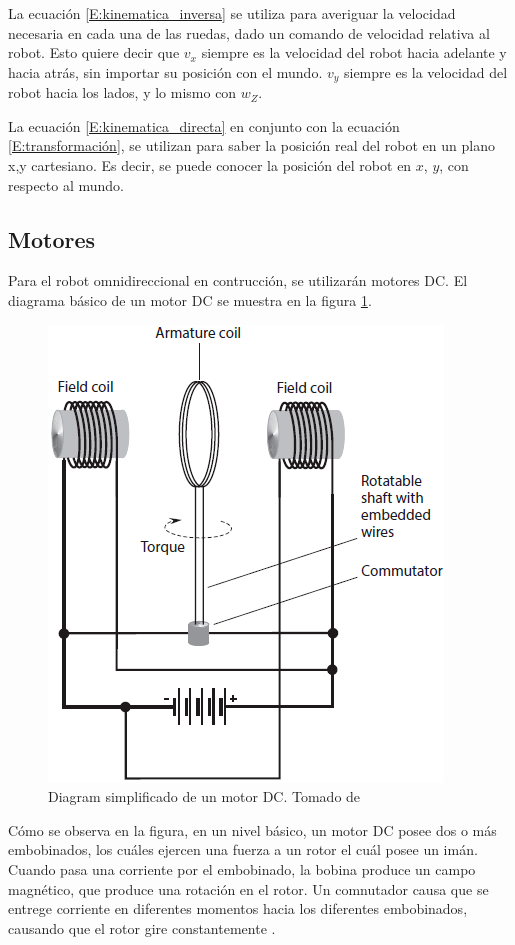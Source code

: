 La ecuación \ref{E:kinematica_inversa} se utiliza para averiguar la velocidad necesaria en cada una de las ruedas, dado un comando de velocidad relativa al robot. Esto quiere decir que $v_x$ siempre es la velocidad del robot hacia adelante y hacia atrás, sin importar su posición con el mundo. $v_y$ siempre es la velocidad del robot hacia los lados, y lo mismo con $w_Z$.

La ecuación \ref{E:kinematica_directa} en conjunto con la ecuación \ref{E:transformación}, se utilizan para saber la posición real del robot en un plano x,y cartesiano. Es decir, se puede conocer la posición del robot en $x$, $y$, con respecto al mundo.

\subsection{Motores}
Para el robot omnidireccional en contrucción, se utilizarán motores DC. El diagrama básico de un motor DC se muestra en la figura \ref{F:motor_dc}.

\begin{figure}[H]
\centering
\includegraphics[scale=0.5]{imagenes/motor_dc.png}
\caption{Diagram simplificado de un motor DC. Tomado de \cite{Giblisco2016}}
\label{F:motor_dc}
\end{figure}

Cómo se observa en la figura, en un nivel básico, un motor DC posee dos o más embobinados, los cuáles ejercen una fuerza a un rotor el cuál posee un imán. Cuando pasa una corriente por el embobinado, la bobina produce un campo magnético, que produce una rotación en el rotor. Un comnutador causa que se entrege corriente en diferentes momentos hacia los diferentes embobinados, causando que el rotor gire constantemente \cite{Giblisco2016}.

